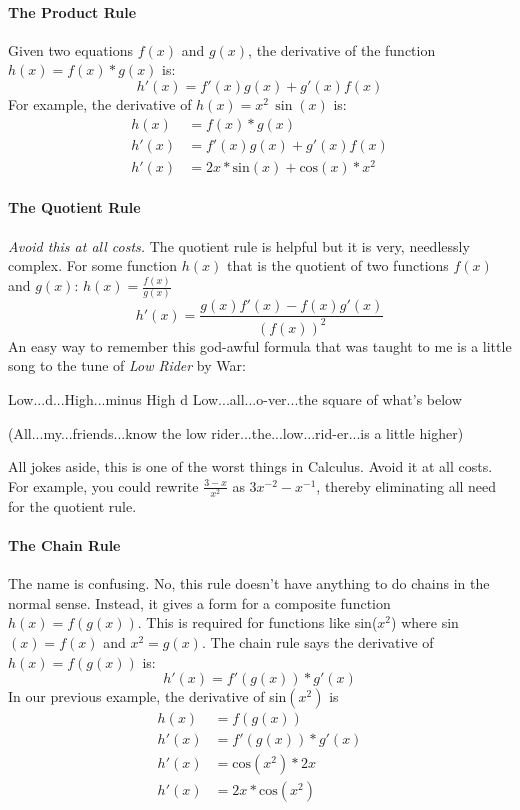 \documentclass[../revisedmain.tex]{subfiles}
\begin{document}
\paragraph{The Product Rule} Given two equations $f(x)$ and $g(x)$, the derivative of the function $h(x)=f(x)*g(x)$ is: $$h'(x)=f'(x)g(x)+g'(x)f(x)$$ For example, the derivative of $h(x)=x^2\,\sin(x)$ is: 
\begin{equation}
\begin{split}
h(x)&=f(x)*g(x) \\
h'(x)&=f'(x)g(x)+g'(x)f(x) \\
h'(x) &= 2x*\text{sin}(x)+\text{cos}(x)*x^2
\end{split}
\end{equation}
\vspace{.25in}\paragraph{The Quotient Rule} \textit{Avoid this at all costs.} The quotient rule is helpful but it is very, needlessly complex. For some function $h(x)$ that is the quotient of two functions $f(x)$ and $g(x)$: $h(x)=\displaystyle\frac{f(x)}{g(x)}$$$h'(x)=\frac{g(x)f'(x)-f(x)g'(x)}{(f(x))^2}$$ An easy way to remember this god-awful formula that was taught to me is a little song to the tune of \textit{Low Rider} by War:
\begin{displayquote}
	Low...d...High...minus High d Low...all...o-ver...the square of what's below 
\end{displayquote}
\begin{displayquote}
	(All...my...friends...know the low rider...the...low...rid-er...is a little higher)
\end{displayquote}
All jokes aside, this is one of the worst things in Calculus. Avoid it at all costs. For example, you could rewrite $\displaystyle\frac{3-x}{x^2}$ as $3x^{-2}-x^{-1}$, thereby eliminating all need for the quotient rule.
\vspace{.25in}\paragraph{The Chain Rule} The name is confusing. No, this rule doesn't have anything to do chains in the normal sense. Instead, it gives a form for a composite function $h(x)=f(g(x))$. This is required for functions like sin($x^2$) where sin$(x)=f(x)$ and $x^2=g(x)$. The chain rule says the derivative of $h(x)=f(g(x))$ is:$$h'(x)=f'(g(x))*g'(x)$$In our previous example, the derivative of sin$(x^2)$ is
\begin{equation}
\begin{split}
h(x) &= f(g(x)) \\
h'(x) &= f'(g(x))*g'(x) \\
h'(x) &= \text{cos}(x^2)*2x \\
h'(x) &= 2x*\text{cos}(x^2)
\end{split}
\end{equation}
\end{document}
